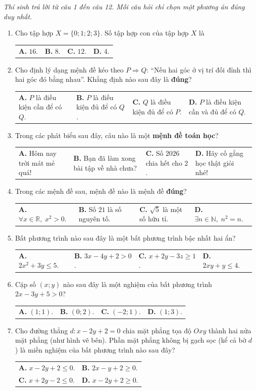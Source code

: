 \documentclass[12pt,a4paper]{article}
\makeatletter
\newcommand{\parttitle}[1]{\par\vspace{2pt}{\large\bfseries\color{ink}#1}\par\vspace{1pt}}
\newcommand{\four}[4]{\par\noindent\begin{tabularx}{\linewidth}{@{}*{4}{>{\raggedright\arraybackslash}X}@{}}\textbf{A.} #1&\textbf{B.} #2&\textbf{C.} #3&\textbf{D.} #4\end{tabularx}}
\newcommand{\two}[4]{\par\noindent\begin{tabularx}{\linewidth}{@{}*{2}{>{\raggedright\arraybackslash}X}@{}}\textbf{A.} #1&\textbf{B.} #2\\[2pt]\textbf{C.} #3&\textbf{D.} #4\end{tabularx}}
\makeatother
\begin{document}
\parttitle{PHẦN I. Trắc nghiệm nhiều lựa chọn}
\textit{Thí sinh trả lời từ câu 1 đến câu 12. Mỗi câu hỏi chỉ chọn một phương án đúng duy nhất.}
\begin{enumerate}
\item Cho tập hợp $X = \{0; 1; 2; 3\}$. Số tập hợp con của tập hợp $X$ là
\four{$16$.}{$8$.}{$12$.}{$4$.}

\item Cho định lý dạng mệnh đề kéo theo $P \Rightarrow Q$: ``Nếu hai góc ở vị trí đối đỉnh thì hai góc đó bằng nhau''. Khẳng định nào sau đây là \textbf{đúng}?
\four{$P$ là điều kiện cần để có $Q$.}{$P$ là điều kiện đủ để có $Q$.}{$Q$ là điều kiện đủ để có $P$.}{$P$ là điều kiện cần và đủ để có $Q$.}

\item Trong các phát biểu sau đây, câu nào là một \textbf{mệnh đề toán học}?
\four{Hôm nay trời mát mẻ quá!}{Bạn đã làm xong bài tập về nhà chưa?}{Số $2026$ chia hết cho $2$.}{Hãy cố gắng học thật giỏi nhé!}

\item Trong các mệnh đề sau, mệnh đề nào là mệnh đề \textbf{đúng}?
\four{$\forall x \in \mathbb{R},\; x^2 > 0$.}{Số $21$ là số nguyên tố.}{$\sqrt{5}$ là một số hữu tỉ.}{$\exists n \in \mathbb{N},\; n^2 = n$.}

\item Bất phương trình nào sau đây là một bất phương trình bậc nhất hai ẩn?
\four{$2x^2 + 3y \le 5$.}{$3x - 4y + 2 > 0$.}{$x + 2y - 3z \ge 1$.}{$2xy + y \le 4$.}

\item Cặp số $(x; y)$ nào sau đây là một nghiệm của bất phương trình $2x - 3y + 5 > 0$?
\four{$(1; 1)$.}{$(0; 2)$.}{$(-2; 1)$.}{$(1; 3)$.}

\item \begin{minipage}[t]{0.70\linewidth}
Cho đường thẳng $d: x - 2y + 2 = 0$ chia mặt phẳng tọa độ $Oxy$ thành hai nửa mặt phẳng (như hình vẽ bên). Phần mặt phẳng không bị gạch sọc (kể cả bờ $d$) là miền nghiệm của bất phương trình nào sau đây?
\vspace{2pt}
\two{$x - 2y + 2 \le 0$.}{$2x - y + 2 \ge 0$.}{$x + 2y - 2 \le 0$.}{$x - 2y + 2 \ge 0$.}
\end{minipage}%
\hfill
\begin{minipage}[t]{0.28\linewidth}
\centering
{}
\end{minipage}


\end{enumerate}
\end{document}
